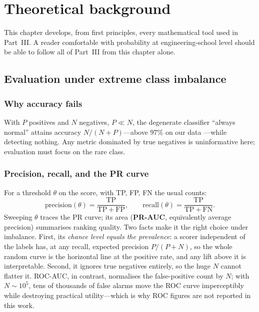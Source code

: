 \documentclass[11pt,a4paper]{report}
\newcommand{\keyword}[1]{\textbf{\color{accent2}#1}}
\begin{document}
\chapter{Theoretical background}
\label{ch:theory}

This chapter develops, from first principles, every mathematical tool used
in Part~III. A reader comfortable with probability at engineering-school
level should be able to follow all of Part~III from this chapter alone.

\section{Evaluation under extreme class imbalance}
\label{sec:theory-metrics}

\subsection{Why accuracy fails}
With $P$ positives and $N$ negatives, $P\ll N$, the degenerate classifier
``always normal'' attains accuracy $N/(N{+}P)$---above $97\%$ on our data
---while detecting nothing. Any metric dominated by true negatives is
uninformative here; evaluation must focus on the rare class.

\subsection{Precision, recall, and the PR curve}
For a threshold $\theta$ on the score, with TP, FP, FN the usual counts:
\[
\mathrm{precision}(\theta)=\frac{\mathrm{TP}}{\mathrm{TP}+\mathrm{FP}},
\qquad
\mathrm{recall}(\theta)=\frac{\mathrm{TP}}{\mathrm{TP}+\mathrm{FN}}.
\]
Sweeping $\theta$ traces the PR curve; its area (\keyword{PR-AUC},
equivalently average precision) summarises ranking quality. Two facts make
it the right choice under imbalance. First, its \emph{chance level equals
the prevalence}: a scorer independent of the labels has, at any recall,
expected precision $P/(P{+}N)$, so the whole random curve is the horizontal
line at the positive rate, and any lift above it is interpretable. Second,
it ignores true negatives entirely, so the huge $N$ cannot flatter it.
ROC-AUC, in contrast, normalises the false-positive count by $N$; with
$N\sim10^5$, tens of thousands of false alarms move the ROC curve
imperceptibly while destroying practical utility---which is why ROC figures
are not reported in this work.
\end{document}
